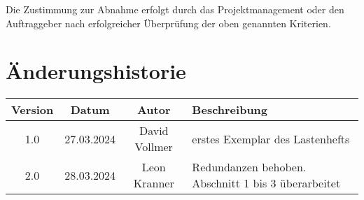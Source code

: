 \documentclass{article}
\begin{document}
Die Zustimmung zur Abnahme erfolgt durch das Projektmanagement oder den Auftraggeber nach erfolgreicher Überprüfung der oben genannten Kriterien.


\section{Änderungshistorie}
\begin{tabular}{|c|c|c|l|}
    \hline
    Version & Datum & Autor & Beschreibung \\
    \hline
    1.0 & 27.03.2024 & David Vollmer & erstes Exemplar des Lastenhefts \\
    \hline
    2.0 & 28.03.2024 & Leon Kranner & Redundanzen behoben. Abschnitt 1 bis 3 überarbeitet \\
    \hline
\end{tabular}
\end{document}
